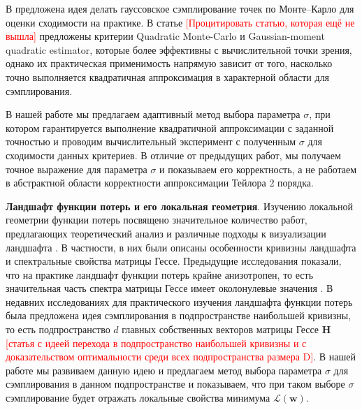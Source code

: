 \documentclass[11pt,a4paper]{article}
\begin{document}
В \cite{kiselev2025robust} предложена идея делать гауссовское сэмплирование точек по Монте--Карло для оценки сходимости на практике. В статье \textcolor{red}{[Процитировать статью, которая ещё не вышла]} предложены критерии Quadratic Monte-Carlo и Gaussian-moment quadratic estimator, которые более эффективны с вычислительной точки зрения, однако их практическая применимость напрямую зависит от того, насколько точно выполняется квадратичная аппроксимация в характерной области для сэмплирования. 

В нашей работе мы предлагаем адаптивный метод выбора параметра $\sigma$, при котором гарантируется выполнение квадратичной аппроксимации с заданной точностью и проводим вычислительный эксперимент с полученным $\sigma$ для сходимости данных критериев. 
В отличие от предыдущих работ, мы получаем точное выражение для параметра $\sigma$ и показываем его корректность, а не работаем в абстрактной области корректности аппроксимации Тейлора 2 порядка.




\textbf{Ландшафт функции потерь и его локальная геометрия}. 
Изучению локальной геометрии функции потерь посвящено значительное количество работ, предлагающих теоретический анализ и различные подходы к визуализации ландшафта \cite{li2018visualizing, xu2024visualizing}. В частности, в них были описаны особенности кривизны ландшафта и спектральные свойства матрицы Гессе\cite{sagun2017empirical, ghorbani2019investigation, wu2021dissecting}.
\newline
Предыдущие исследования показали, что на практике ландшафт функции потерь крайне анизотропен, то есть значительная часть спектра матрицы Гессе имеет околонулевые значения \cite{baskerville2021appearance, singh2023hessian}. В недавних исследованиях для практического изучения ландшафта функции потерь была предложена идея сэмплирования в подпространстве наибольшей кривизны, то есть подпространство $d$ главных собственных векторов матрицы Гессе $\mathbf{H}$ \textcolor{red}{[статья с идеей перехода в подпространство наибольшей кривизны и с доказательством оптимальности среди всех подпространства размера D]}. В нашей работе мы развиваем данную идею и предлагаем метод выбора параметра $\sigma$ для сэмплирования в данном подпространстве и показываем, что при таком выборе $\sigma$ сэмплирование будет отражать локальные свойства минимума $\mathcal{L}(\mathbf{w})$.
\end{document}
